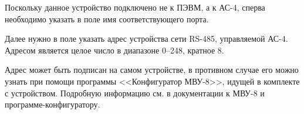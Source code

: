 Поскольку данное устройство подключено не к ПЭВМ, а к АС-4, сперва необходимо указать в поле  имя соответствующего порта.

Далее нужно в поле  указать адрес устройства сети RS-485, управляемой АС-4. Адресом является целое число в диапазоне 0--248, кратное 8.

Адрес может быть подписан на самом устройстве, в противном случае его можно узнать при помощи программы <<Конфигуратор МВУ-8>>, идущей в комплекте с устройством. Подробную информацию см. в документации к МВУ-8 и программе-конфигуратору.

